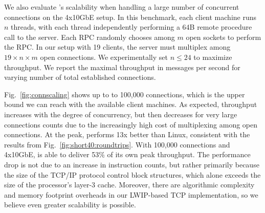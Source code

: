 \label{sec:eval:scale}

We also evaluate \ix's scalability when handling a large number of
concurrent connections on the 4x10GbE setup. In this benchmark, each client machine runs
$n$ threads, with each thread independently performing a 64B remote
procedure call to the server.  Each RPC randomly chooses among $m$
open sockets to perform the RPC.  In our setup with 19 clients, the
server must multiplex among $19 \times n \times m$ open connections.
We experimentally set $n \leq 24$ to maximize throughput.  We report
the maximal throughput in messages per second for varying number of
total established connections.



Fig.~\ref{fig:connscaling} shows up to to 100,000 connections, which
is the upper bound we can reach with the available client machines.
As expected, throughput increases with the degree of concurrency, but
then decreases for very large connections counts due to the
increasingly high cost of multiplexing among open connections.  At the
peak, \ix performs 13x better than Linux, consistent with the results
from Fig.~\ref{fig:short40:roundtrips}.  With 100,000 connections and
4x10GbE, \ix is able to deliver 53\% of its own peak throughput.  The
performance drop is not due to an increase in instruction counts, but
rather primarily because the size of the TCP/IP protocol control block
structures, which alone exceeds the size of the processor's layer-3
cache.  Moreover, there are algorithmic complexity and memory footprint overheads
in our LWIP-based TCP implementation, so we believe even greater scalability is possible.


